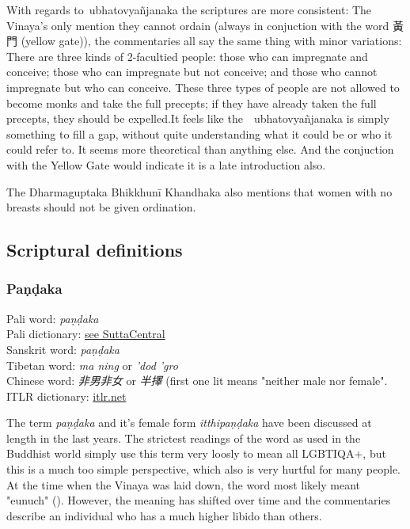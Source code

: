 With regards to ubhatovyañjanaka the scriptures are more consistent: The Vinaya's only mention they cannot ordain (always in conjuction with the word 黃門 (yellow gate)), the commentaries all say the same thing with minor variations: There are three kinds of 2-facultied people: those who can impregnate and conceive; those who can impregnate but not conceive; and those who cannot impregnate but who can conceive. These three types of people are not allowed to become monks and take the full precepts; if they have already taken the full precepts, they should be expelled.It feels like the  ubhatovyañjanaka is simply something to fill a gap, without quite understanding what it could be or who it could refer to. It seems more theoretical than anything else. And the conjuction with the Yellow Gate would indicate it is a late introduction also.



The Dharmaguptaka Bhikkhunī Khandhaka also mentions that women with no breasts should not be given ordination.



\subsection{Scriptural definitions}

\subsubsection{Paṇḍaka}

Pali word: {\em paṇḍaka} \\
Pali dictionary: \href{https://suttacentral.net/define/pa%E1%B9%87%E1%B8%8Daka}{see SuttaCentral} \\
Sanskrit word: {\em paṇḍaka} \\
Tibetan word: {\em ma ning} or {\em ’dod ’gro} \\
Chinese word: {\em 非男非女} or {\em 半擇} (first one lit means "neither male nor female".\\
ITLR dictionary: \href{http://www.itlr.net/hwid:281142}{itlr.net} \\

\medskip

The term {\em paṇḍaka } and it's female form {\em itthipaṇḍaka } have been discussed at length in the last years. The strictest readings of the word as used in the Buddhist world simply use this term very loosly to mean all LGBTIQA+, but this is a much too simple perspective, which also is very hurtful for many people. At the time when the Vinaya was laid down, the word most likely meant "eunuch" (\cite{vimala}). However, the meaning has shifted over time and the commentaries describe an individual who has a much higher libido than others.

